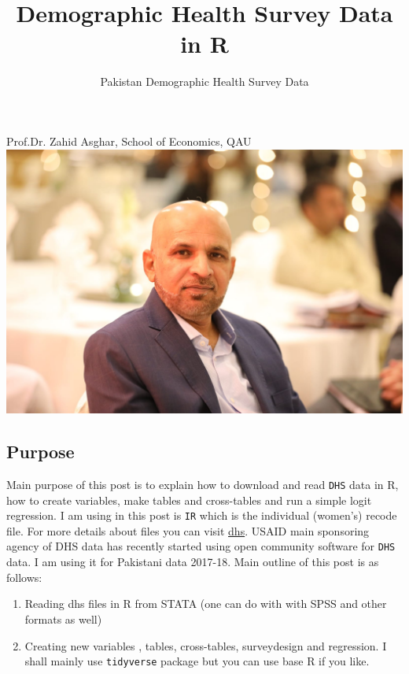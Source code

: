 \documentclass[
  letterpaper,
  DIV=11,
  numbers=noendperiod]{scrartcl}
\title{{Demographic Health Survey Data in R}}
\subtitle{Pakistan Demographic Health Survey Data}
\author{}
\date{}
\renewcommand*\contentsname{Table of contents}
\newcommand\contentsname{Table of contents}
\begin{document}
\maketitle
\ifdefined\Shaded\renewenvironment{Shaded}{\begin{tcolorbox}[boxrule=0pt, breakable, borderline west={3pt}{0pt}{shadecolor}, interior hidden, frame hidden, enhanced, sharp corners]}{\end{tcolorbox}}\fi

\renewcommand*\contentsname{Table of contents}
{
\hypersetup{linkcolor=}
\setcounter{tocdepth}{3}
\tableofcontents
}
Prof.Dr. Zahid Asghar, School of Economics,
QAU\includegraphics{images/zahid.jpg}

\hypertarget{purpose}{%
\subsection{Purpose}\label{purpose}}

Main purpose of this post is to explain how to download and read
\texttt{DHS} data in R, how to create variables, make tables and
cross-tables and run a simple logit regression. I am using in this post
is \texttt{IR} which is the individual (women's) recode file. For more
details about files you can visit \href{dhsprogram.com}{dhs}. USAID main
sponsoring agency of DHS data has recently started using open community
software for \texttt{DHS} data. I am using it for Pakistani data
2017-18. Main outline of this post is as follows:

\begin{enumerate}
\def\labelenumi{\roman{enumi})}
\item
  Reading dhs files in R from STATA (one can do with with SPSS and other
  formats as well)
\item
  Creating new variables , tables, cross-tables, surveydesign and
  regression. I shall mainly use \texttt{tidyverse} package but you can
  use base R if you like.
\end{enumerate}
\end{document}
